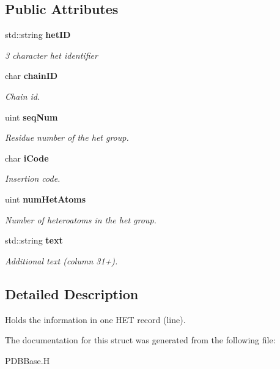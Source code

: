 \subsection*{Public Attributes}
\begin{CompactItemize}
\item 
std::string \bf{het\-ID}\label{structSimSite3D_1_1PDBBase_1_1het__record__type_38f67500111621ed6aa96f49a1ccc566}

\begin{CompactList}\small\item\em 3 character het identifier \item\end{CompactList}\item 
char \bf{chain\-ID}\label{structSimSite3D_1_1PDBBase_1_1het__record__type_f375324a95c74d9124203d8a099db88f}

\begin{CompactList}\small\item\em Chain id. \item\end{CompactList}\item 
uint \bf{seq\-Num}\label{structSimSite3D_1_1PDBBase_1_1het__record__type_7e67fcacb534bfc058abb1f17f495dad}

\begin{CompactList}\small\item\em Residue number of the het group. \item\end{CompactList}\item 
char \bf{i\-Code}\label{structSimSite3D_1_1PDBBase_1_1het__record__type_e9c3b632888b75ee4aee65efe7b421ab}

\begin{CompactList}\small\item\em Insertion code. \item\end{CompactList}\item 
uint \bf{num\-Het\-Atoms}\label{structSimSite3D_1_1PDBBase_1_1het__record__type_62ab9f80b81042ccc0e0781c40d6d9be}

\begin{CompactList}\small\item\em Number of heteroatoms in the het group. \item\end{CompactList}\item 
std::string \bf{text}\label{structSimSite3D_1_1PDBBase_1_1het__record__type_3d9324eb71930e1e35944cd9d9c08f51}

\begin{CompactList}\small\item\em Additional text (column 31+). \item\end{CompactList}\end{CompactItemize}


\subsection{Detailed Description}
Holds the information in one HET record (line). 



The documentation for this struct was generated from the following file:\begin{CompactItemize}
\item 
PDBBase.H\end{CompactItemize}
